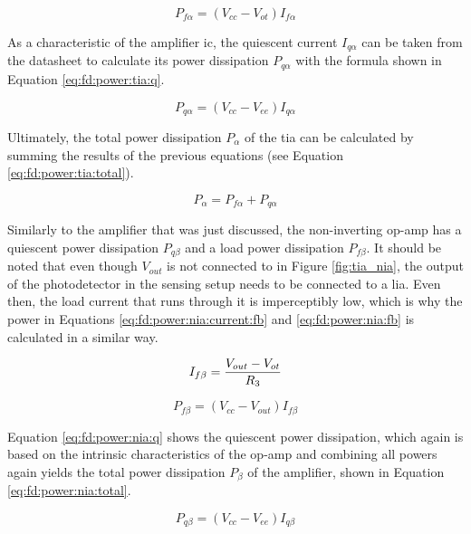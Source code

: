 \begin{equation}\label{eq:fd:power:tia:fb}
	P_{f\alpha} = (V_{cc} - V_{ot})I_{f\alpha}
\end{equation}


As a characteristic of the amplifier \gls{ic}, the quiescent current $I_{q\alpha}$ can be taken from the datasheet to calculate its power dissipation $P_{q\alpha}$ with the formula shown in Equation \eqref{eq:fd:power:tia:q}.

\begin{equation}\label{eq:fd:power:tia:q}
	P_{q\alpha} = (V_{cc} - V_{ee})I_{q\alpha}
\end{equation}

Ultimately, the total power dissipation $P_{\alpha}$ of the \gls{tia} can be calculated by summing the results of the previous equations (see Equation \eqref{eq:fd:power:tia:total}).

\begin{equation}\label{eq:fd:power:tia:total}
	P_{\alpha} = P_{f\alpha} + P_{q\alpha}
\end{equation}

Similarly to the amplifier that was just discussed, the non-inverting op-amp has a quiescent power dissipation $P_{q\beta}$ and a load power dissipation $P_{f\beta}$. It should be noted that even though $V_{out}$ is not connected to in Figure \ref{fig:tia_nia}, the output of the photodetector in the sensing setup needs to be connected to a \gls{lia}. Even then, the load current that runs through it is imperceptibly low, which is why the power in Equations \eqref{eq:fd:power:nia:current:fb} and \eqref{eq:fd:power:nia:fb} is calculated in a similar way. 

\begin{equation}\label{eq:fd:power:nia:current:fb}
		I_{f\beta} = \frac{V_{out} - V_{ot}}{R_3}\\
\end{equation}

\begin{equation}\label{eq:fd:power:nia:fb}
	P_{f\beta} = (V_{cc} - V_{out})I_{f\beta}
\end{equation}


Equation \eqref{eq:fd:power:nia:q} shows the quiescent power dissipation, which again is based on the intrinsic characteristics of the op-amp and combining all powers again yields the total power dissipation $P_\beta$ of the amplifier, shown in Equation \eqref{eq:fd:power:nia:total}.

\begin{equation}\label{eq:fd:power:nia:q}
	P_{q\beta} = (V_{cc} - V_{ee})I_{q\beta}
\end{equation}



